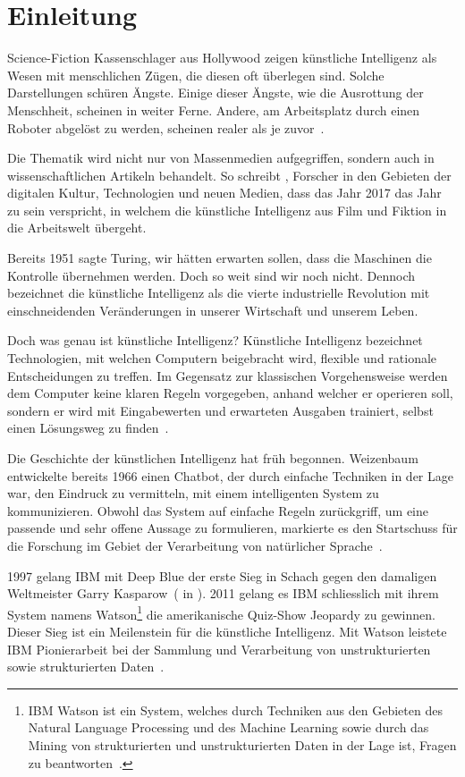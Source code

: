 \section{Einleitung}

Science-Fiction Kassenschlager aus Hollywood zeigen künstliche Intelligenz als Wesen mit menschlichen Zügen, die diesen oft überlegen sind. Solche Darstellungen schüren Ängste. Einige dieser Ängste, wie die Ausrottung der Menschheit, scheinen in weiter Ferne. Andere, am Arbeitsplatz durch einen Roboter abgelöst zu werden, scheinen realer als je zuvor~\autocite{Lu2018}.

Die Thematik wird nicht nur von Massenmedien aufgegriffen, sondern auch in wissenschaftlichen Artikeln behandelt. So schreibt \textcite{Tredinnick2017}, Forscher in den Gebieten der digitalen Kultur, Technologien und neuen Medien, dass das Jahr 2017 das Jahr zu sein verspricht, in welchem die künstliche Intelligenz aus Film und Fiktion in die Arbeitswelt übergeht. 

Bereits 1951 sagte Turing, wir hätten erwarten sollen, dass die Maschinen die Kontrolle übernehmen werden. Doch so weit sind wir noch nicht. Dennoch bezeichnet \textcite{Tredinnick2017} die künstliche Intelligenz als die vierte industrielle Revolution mit einschneidenden Veränderungen in unserer Wirtschaft und unserem Leben.

Doch was genau ist künstliche Intelligenz? Künstliche Intelligenz bezeichnet Technologien, mit welchen Computern beigebracht wird, flexible und rationale Entscheidungen zu treffen. Im Gegensatz zur klassischen Vorgehensweise werden dem Computer keine klaren Regeln vorgegeben, anhand welcher er operieren soll, sondern er wird mit Eingabewerten und erwarteten Ausgaben trainiert, selbst einen Lösungsweg zu finden~\autocite{Tredinnick2017}.

Die Geschichte der künstlichen Intelligenz hat früh begonnen. Weizenbaum entwickelte bereits 1966 einen Chatbot, der durch einfache Techniken in der Lage war, den Eindruck zu vermitteln, mit einem intelligenten System zu kommunizieren. Obwohl das System auf einfache Regeln zurückgriff, um eine passende und sehr offene Aussage zu formulieren, markierte es den Startschuss für die Forschung im Gebiet der Verarbeitung von natürlicher Sprache~\autocite{Tredinnick2017}. 

1997 gelang IBM mit Deep Blue der erste Sieg in Schach gegen den damaligen Weltmeister Garry Kasparow~(\cite{Campbell} in \cite{Tredinnick2017}). 2011 gelang es IBM schliesslich mit ihrem System namens Watson\footnote{IBM Watson ist ein System, welches durch Techniken aus den Gebieten des Natural Language Processing und des Machine Learning sowie durch das Mining von strukturierten und unstrukturierten Daten in der Lage ist, Fragen zu beantworten~\autocite{Tredinnick2017}.} die amerikanische Quiz-Show Jeopardy zu gewinnen. Dieser Sieg ist ein Meilenstein für die künstliche Intelligenz. Mit Watson leistete IBM Pionierarbeit bei der Sammlung und Verarbeitung von unstrukturierten sowie strukturierten Daten~\autocite{Tredinnick2017}.


